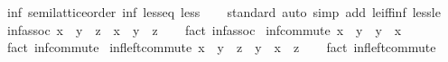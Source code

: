 \begin{isabellebody}
\isamarkupfalse%
%
\endisatagproof
{\isafoldproof}%
%
\isadelimproof
\isanewline
%
\endisadelimproof
\isanewline
{}\isamarkupfalse%
\ inf{\isacharcolon}{\kern0pt}\ semilattice{\isacharunderscore}{\kern0pt}order\ inf\ less{\isacharunderscore}{\kern0pt}eq\ less\isanewline
%
\isadelimproof
\ \ %
\endisadelimproof
%
\isatagproof
{}\isamarkupfalse%
\ standard\ {\isacharparenleft}{\kern0pt}auto\ simp\ add{\isacharcolon}{\kern0pt}\ le{\isacharunderscore}{\kern0pt}iff{\isacharunderscore}{\kern0pt}inf\ less{\isacharunderscore}{\kern0pt}le{\isacharparenright}{\kern0pt}%
\endisatagproof
{\isafoldproof}%
%
\isadelimproof
\isanewline
%
\endisadelimproof
\isanewline
{}\isamarkupfalse%
\ inf{\isacharunderscore}{\kern0pt}assoc{\isacharcolon}{\kern0pt}\ {\isachardoublequoteopen}{\isacharparenleft}{\kern0pt}x\ {\isasymsqinter}\ y{\isacharparenright}{\kern0pt}\ {\isasymsqinter}\ z\ {\isacharequal}{\kern0pt}\ x\ {\isasymsqinter}\ {\isacharparenleft}{\kern0pt}y\ {\isasymsqinter}\ z{\isacharparenright}{\kern0pt}{\isachardoublequoteclose}\isanewline
%
\isadelimproof
\ \ %
\endisadelimproof
%
\isatagproof
{}\isamarkupfalse%
\ {\isacharparenleft}{\kern0pt}fact\ inf{\isachardot}{\kern0pt}assoc{\isacharparenright}{\kern0pt}%
\endisatagproof
{\isafoldproof}%
%
\isadelimproof
\isanewline
%
\endisadelimproof
\isanewline
{}\isamarkupfalse%
\ inf{\isacharunderscore}{\kern0pt}commute{\isacharcolon}{\kern0pt}\ {\isachardoublequoteopen}{\isacharparenleft}{\kern0pt}x\ {\isasymsqinter}\ y{\isacharparenright}{\kern0pt}\ {\isacharequal}{\kern0pt}\ {\isacharparenleft}{\kern0pt}y\ {\isasymsqinter}\ x{\isacharparenright}{\kern0pt}{\isachardoublequoteclose}\isanewline
%
\isadelimproof
\ \ %
\endisadelimproof
%
\isatagproof
{}\isamarkupfalse%
\ {\isacharparenleft}{\kern0pt}fact\ inf{\isachardot}{\kern0pt}commute{\isacharparenright}{\kern0pt}%
\endisatagproof
{\isafoldproof}%
%
\isadelimproof
\isanewline
%
\endisadelimproof
\isanewline
{}\isamarkupfalse%
\ inf{\isacharunderscore}{\kern0pt}left{\isacharunderscore}{\kern0pt}commute{\isacharcolon}{\kern0pt}\ {\isachardoublequoteopen}x\ {\isasymsqinter}\ {\isacharparenleft}{\kern0pt}y\ {\isasymsqinter}\ z{\isacharparenright}{\kern0pt}\ {\isacharequal}{\kern0pt}\ y\ {\isasymsqinter}\ {\isacharparenleft}{\kern0pt}x\ {\isasymsqinter}\ z{\isacharparenright}{\kern0pt}{\isachardoublequoteclose}\isanewline
%
\isadelimproof
\ \ %
\endisadelimproof
%
\isatagproof
{}\isamarkupfalse%
\ {\isacharparenleft}{\kern0pt}fact\ inf{\isachardot}{\kern0pt}left{\isacharunderscore}{\kern0pt}commute{\isacharparenright}{\kern0pt}%

\end{isabellebody}
